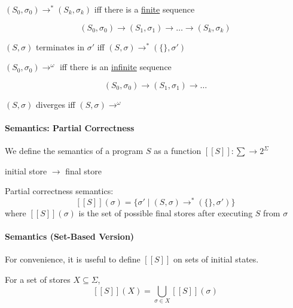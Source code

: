 \documentclass[12pt, a4paper]{book}
\begin{document}
$(S_{0}, \sigma_{0}) \longrightarrow^{*} (S_{k}, \sigma_{k})$ iff there is a
\underline{finite} sequence

$$
(S_{0}, \sigma_{0}) \longrightarrow (S_{1}, \sigma_{1}) \longrightarrow \ldots
\longrightarrow (S_{k}, \sigma_{k})
$$

$(S, \sigma)$ terminates in $\sigma'$ iff $(S, \sigma) \longrightarrow^{*} (\{\}, \sigma')$

$(S_{0}, \sigma_{0}) \longrightarrow^{\omega}$ iff there is an \underline{infinite} sequence

$$
(S_{0}, \sigma_{0}) \longrightarrow (S_{1}, \sigma_{1}) \longrightarrow \ldots
$$

$(S,\sigma)$ diverges iff $(S,\sigma) \longrightarrow^{\omega}$

\paragraph{Semantics: Partial Correctness}

We define the semantics of a program $S$ as a function $[[S]]: \sum \rightarrow 2^{\Sigma}$ \newline

initial store $\rightarrow$ final store \newline

Partial correctness semantics:
$$
[[S]](\sigma) = \{\sigma' \mid (S,\sigma) \longrightarrow^{*} (\{\}, \sigma')\}
$$
where $[[S]](\sigma)$ is the set of possible final stores after executing $S$
from $\sigma$

\paragraph{Semantics (Set-Based Version)}

For convenience, it is useful to define $[[S]]$ on sets of initial states. \newline

For a set of stores $X \subseteq \Sigma$,
$$
[[S]](X) = \bigcup_{\sigma \in X} [[S]](\sigma)
$$

\end{document}
